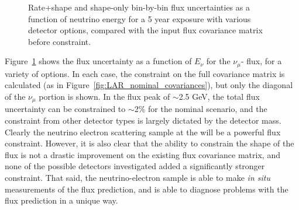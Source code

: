 \begin{figure}[htbp]
  \centering
  \caption{Rate+shape and shape-only bin-by-bin flux uncertainties as a function of neutrino energy for a 5 year exposure with various detector options, compared with the input flux covariance matrix before constraint.}
  \label{fig:nominal_det_constraint}
\end{figure}
Figure~\ref{fig:nominal_det_constraint} shows the flux uncertainty as a function of $E_{\nu}$ for the $\nu_{\mu}$- flux, for a variety of  options. In each case, the constraint on the full covariance matrix is calculated (as in Figure~\ref{fig:LAR_nominal_covariances}), but only the diagonal of the $\nu_{\mu}$ portion is shown. In the flux peak of $\sim$2.5 GeV, the total flux uncertainty can be constrained to $\sim$2\% for the nominal  scenario, and the constraint from other detector types is largely dictated by the detector mass. Clearly the neutrino electron scattering sample at the   will be a powerful flux constraint. However, it is also clear that the ability to constrain the shape of the flux is not a drastic improvement on the existing flux covariance matrix, and none of the possible detectors investigated added a significantly stronger constraint. That said, the neutrino-electron sample is able to make \textit{in situ} measurements of the flux prediction, and is able to diagnose problems with the flux prediction in a unique way.



